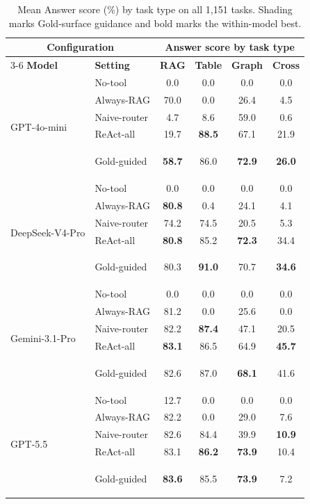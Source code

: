 \documentclass[11pt]{article}
\newcommand{\gbox}[1]{\begingroup\setlength{\fboxsep}{1.2pt}\colorbox{guidanceblue}{\strut #1}\endgroup}
\begin{document}
\begin{table}[t]
\centering\small
\renewcommand{\arraystretch}{1.08}
\setlength{\tabcolsep}{4.2pt}
\begin{tabular*}{\textwidth}{@{\extracolsep{\fill}}llcccc}
\toprule
\multicolumn{2}{c}{\textbf{Configuration}} & \multicolumn{4}{c}{\textbf{Answer score by task type}} \\
\cmidrule(lr){3-6}
\textbf{Model} & \textbf{Setting} & \textbf{RAG} & \textbf{Table} & \textbf{Graph} & \textbf{Cross} \\
\midrule
\multirow{5}{*}{GPT-4o-mini} & No-tool & 0.0 & 0.0 & 0.0 & 0.0 \\
 & Always-RAG & 70.0 & 0.0 & 26.4 & 4.5 \\
 & Naive-router & 4.7 & 8.6 & 59.0 & 0.6 \\
 & ReAct-all & 19.7 & \textbf{88.5} & 67.1 & 21.9 \\
 & \gbox{Gold-guided} & \gbox{\textbf{58.7}} & \gbox{86.0} & \gbox{\textbf{72.9}} & \gbox{\textbf{26.0}} \\
\midrule
\multirow{5}{*}{DeepSeek-V4-Pro} & No-tool & 0.0 & 0.0 & 0.0 & 0.0 \\
 & Always-RAG & \textbf{80.8} & 0.4 & 24.1 & 4.1 \\
 & Naive-router & 74.2 & 74.5 & 20.5 & 5.3 \\
 & ReAct-all & \textbf{80.8} & 85.2 & \textbf{72.3} & 34.4 \\
 & \gbox{Gold-guided} & \gbox{80.3} & \gbox{\textbf{91.0}} & \gbox{70.7} & \gbox{\textbf{34.6}} \\
\midrule
\multirow{5}{*}{Gemini-3.1-Pro} & No-tool & 0.0 & 0.0 & 0.0 & 0.0 \\
 & Always-RAG & 81.2 & 0.0 & 25.6 & 0.0 \\
 & Naive-router & 82.2 & \textbf{87.4} & 47.1 & 20.5 \\
 & ReAct-all & \textbf{83.1} & 86.5 & 64.9 & \textbf{45.7} \\
 & \gbox{Gold-guided} & \gbox{82.6} & \gbox{87.0} & \gbox{\textbf{68.1}} & \gbox{41.6} \\
\midrule
\multirow{5}{*}{GPT-5.5} & No-tool & 12.7 & 0.0 & 0.0 & 0.0 \\
 & Always-RAG & 82.2 & 0.0 & 29.0 & 7.6 \\
 & Naive-router & 82.6 & 84.4 & 39.9 & \textbf{10.9} \\
 & ReAct-all & 83.1 & \textbf{86.2} & \textbf{73.9} & 10.4 \\
 & \gbox{Gold-guided} & \gbox{\textbf{83.6}} & \gbox{85.5} & \gbox{\textbf{73.9}} & \gbox{7.2} \\
\bottomrule
\end{tabular*}
\caption{Mean Answer score (\%) by task type on all 1{,}151 tasks. Shading marks
Gold-surface guidance and bold marks the within-model best.}
\label{tab:persurface}
\end{table}
\end{document}
